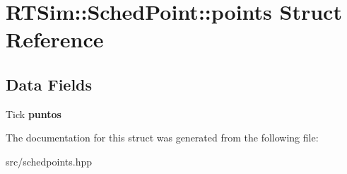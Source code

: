 \hypertarget{structRTSim_1_1SchedPoint_1_1points}{}\section{R\+T\+Sim\+:\+:Sched\+Point\+:\+:points Struct Reference}
\label{structRTSim_1_1SchedPoint_1_1points}
\subsection*{Data Fields}
\begin{DoxyCompactItemize}
\item 
Tick {\bfseries puntos}\hypertarget{structRTSim_1_1SchedPoint_1_1points_a947d4d90debdddf22233d3d41381396f}{}\label{structRTSim_1_1SchedPoint_1_1points_a947d4d90debdddf22233d3d41381396f}

\end{DoxyCompactItemize}


The documentation for this struct was generated from the following file\+:\begin{DoxyCompactItemize}
\item 
src/schedpoints.\+hpp\end{DoxyCompactItemize}
